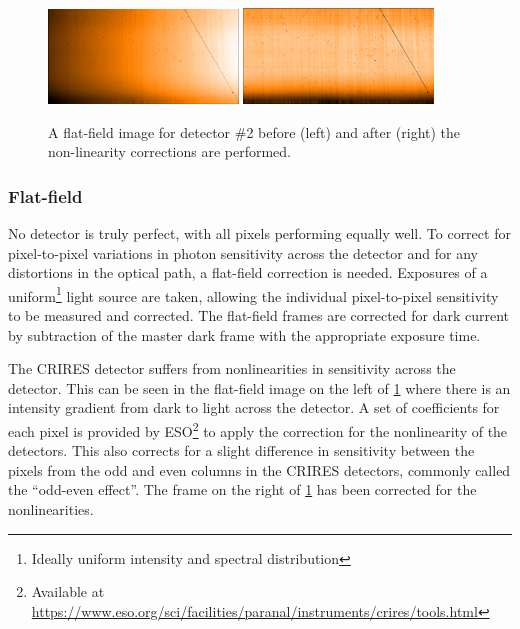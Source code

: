 \begin{figure}[h]
    \centering
        \includegraphics[width=0.45\textwidth]{figures/reduction/Flat_2.png} %
        \includegraphics[width=0.45\textwidth]{figures/reduction/FlatR_2.png} %
    \caption{A flat-field image for detector \#2 before (left) and after (right) the non-linearity corrections are performed.}
    \label{fig:masterflats_colour}
\end{figure}


\subsubsection{Flat-field}
\label{subsubsec:flat-field}
No detector is truly perfect, with all pixels performing equally well.
To correct for pixel-to-pixel variations in photon sensitivity across the detector and for any distortions in the optical path, a flat-field correction is needed.
Exposures of a uniform\footnote{Ideally uniform intensity and spectral distribution} light source are taken, allowing the individual pixel-to-pixel sensitivity to be measured and corrected.
The flat-field frames are corrected for dark current by subtraction of the master dark frame with the appropriate exposure time.

The {CRIRES} detector suffers from nonlinearities in sensitivity across the detector.
This can be seen in the flat-field image on the left of \cref{fig:masterflats_colour} where there is an intensity gradient from dark to light across the detector.
A set of coefficients for each pixel is provided by {ESO}\footnote{Available at \href{https://www.eso.org/sci/facilities/paranal/instruments/crires/tools.html}{https://www.eso.org/sci/facilities/paranal/instruments/crires/tools.html}} to apply the correction for the nonlinearity of the detectors.
This also corrects for a slight difference in sensitivity between the pixels from the odd and even columns in the {CRIRES} detectors, commonly called the ``odd-even effect''.
The frame on the right of \cref{fig:masterflats_colour} has been corrected for the nonlinearities.

